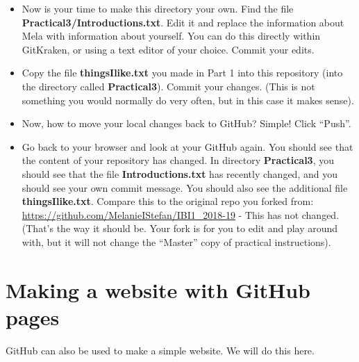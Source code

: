 \documentclass[pdflatex,a4paper]{article}
\begin{document}
\begin{itemize}
\item
Now is your time to make this directory your own. Find the file \textbf{Practical3/Introductions.txt}. Edit it and replace the information about Mela with information about yourself. You can do this directly within GitKraken, or using a text editor of your choice. Commit your edits. 
\item
Copy the file \textbf{thingsIlike.txt} you made in Part 1 into this repository (into the directory called \textbf{Practical3}). Commit your changes. (This is not something you would normally do very often, but in this case it makes sense).
\item
Now, how to move your local changes back to GitHub? Simple! Click ``Push''.
\item
Go back to your browser and look at your GitHub again. You should see that the content of your repository has changed. In directory \textbf{Practical3}, you should see that the file \textbf{Introductions.txt} has recently changed, and you should see your own commit message. You should also see the additional file \textbf{thingsIlike.txt}. Compare this to the original repo you forked from: \url{https://github.com/MelanieIStefan/IBI1_2018-19} - This has not changed. (That's the way it should be. Your fork is for you to edit and play around with, but it will not change the ``Master'' copy of practical instructions).
\end{itemize}



\section{Making a website with GitHub pages}

GitHub can also be used to make a simple website. We will do this here. 
\end{document}
